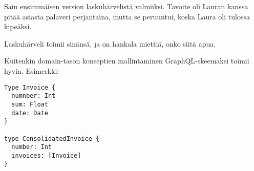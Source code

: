 Sain ensimmäisen version laskuhärvelistä valmiiksi. Tavoite oli Lauran
kanssa pitää asiasta palaveri perjantaina, mutta se peruuntui, koska
Laura oli tulossa kipeäksi.

Laskuhärveli toimii sinänsä, ja on hankala miettiä, onko siitä apua.

Kuitenkin domain-tason konseptien mallintaminen GraphQL-skeemaksi toimii
hyvin. Esimerkki:

\begin{verbatim}
Type Invoice {
  numnber: Int
  sum: Float
  date: Date
}

type ConsolidatedInvoice {
  number: Int
  invoices: [Invoice]
}
\end{verbatim}
